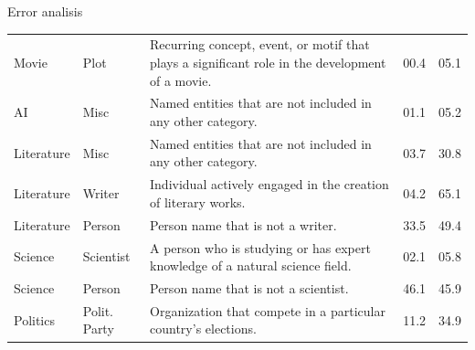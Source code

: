 \documentclass[
    11pt,
    notheorems,
    xcolor={dvipsnames},
    hyperref={
        pdfstartview=FitH, 
        pdftitle={Ikasketa-adibide urriko Informazio-Erauzketa}, 
        pdfauthor={Oscar Sainz Jimenez}, 
        citecolor=secondary, 
    }
]{beamer}
\begin{document}
\begin{frame}[t]
\begin{block}{Error analisis}
\begin{table}
{\begin{tabular}{@{}llp{12cm}cc@{}}
                
                \rowcolor{Thistle!10} \rule{0pt}{2ex}Movie            & Plot                               & Recurring concept, event, or motif that plays a significant role in the development of a movie.                  & 00.4              & 05.1            \\
                \rowcolor{Thistle!10} \rule{0pt}{2ex} AI               & Misc                               & Named entities that are not included in any other category.                                                      & 01.1              & 05.2            \\
                \rowcolor{Thistle!10} \rule{0pt}{2ex} Literature       & Misc                               & Named entities that are not included in any other category.                                                      & 03.7              & 30.8            \\
                \rowcolor{Thistle!10} \rule{0pt}{2ex} Literature       & Writer                             & Individual actively engaged in the creation of literary works.                                                   & 04.2              & 65.1            \\
                \rowcolor{Thistle!10} \rule{0pt}{2ex} Literature       & Person                             & Person name that is not a writer.                                                                                & 33.5              & 49.4            \\
                \rowcolor{Thistle!10} \rule{0pt}{2ex} Science          & Scientist                          & A person who is studying or has expert knowledge of a natural science field.                                     & 02.1              & 05.8      \\
                \rowcolor{Thistle!10} \rule{0pt}{2ex} Science          & Person                             & Person name that is not a scientist.                                                                             & 46.1              & 45.9            \\
                \rowcolor{Thistle!10} \rule{0pt}{2ex} Politics         & Polit. Party                       & Organization that compete in a particular country's elections.                                                   & 11.2              & 34.9 \\
                    \bottomrule
                \end{tabular}}
            \label{tab:error_analysis}
        \end{table}
        \medskip


\end{block}
\end{frame}
\end{document}
